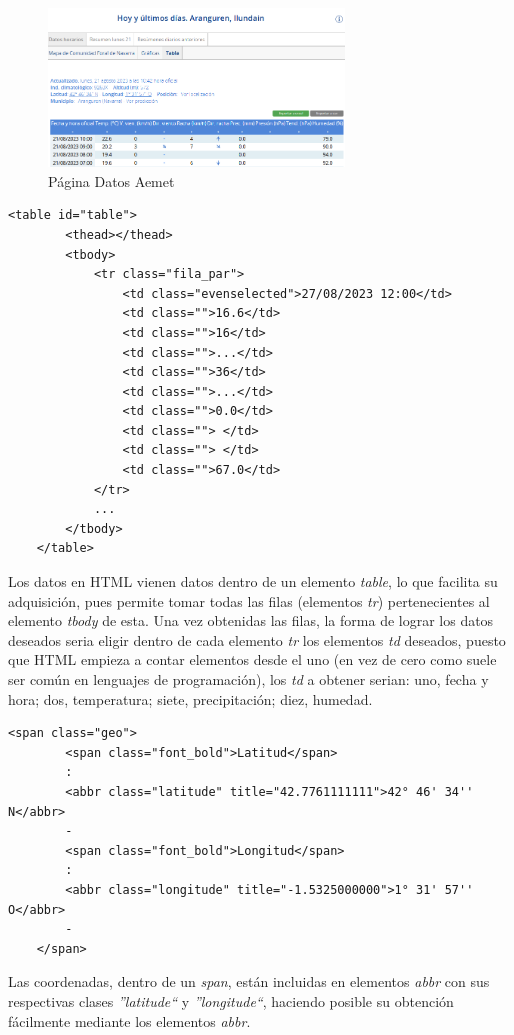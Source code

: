 \begin{figure} [H]
	\centering
	\includegraphics[width=0.7\textwidth]{fig/AemetData.png}
	\caption[Página Aemet de la estación en Aranguren (Navarra)]{Página Datos Aemet}
	\label{fig:ej3}
\end{figure}

\begin{lstlisting}[basicstyle=\footnotesize, caption={HTML tabla datos en Aemet}]
	<table id="table">
		<thead></thead>
		<tbody>
			<tr class="fila_par">
				<td class="evenselected">27/08/2023 12:00</td>
				<td class="">16.6</td>
				<td class="">16</td>
				<td class="">...</td>
				<td class="">36</td>
				<td class="">...</td>
				<td class="">0.0</td>
				<td class=""> </td>
				<td class=""> </td>
				<td class="">67.0</td>
			</tr>
			...
		</tbody>
	</table>
\end{lstlisting}

Los datos en HTML vienen datos dentro de un elemento \textit{table}, lo que facilita su adquisición, pues permite tomar todas las filas (elementos \textit{tr}) pertenecientes al elemento \textit{tbody} de esta. Una vez obtenidas las filas, la forma de lograr los datos deseados seria eligir dentro de cada elemento \textit{tr} los elementos \textit{td} deseados, puesto que HTML empieza a contar elementos desde el uno (en vez de cero como suele ser común en lenguajes de programación), los \textit{td} a obtener serian: uno, fecha y hora; dos, temperatura; siete, precipitación; diez, humedad.

\begin{lstlisting}[basicstyle=\footnotesize, caption={HTML coordenadas en Aemet}]
	<span class="geo">
		<span class="font_bold">Latitud</span>
		:
		<abbr class="latitude" title="42.7761111111">42° 46' 34'' N</abbr>
		-
		<span class="font_bold">Longitud</span>
		:
		<abbr class="longitude" title="-1.5325000000">1° 31' 57'' O</abbr>
		-
	</span>
\end{lstlisting}

Las coordenadas, dentro de un \textit{span}, están incluidas en elementos \textit{abbr} con sus respectivas clases \textit{''latitude``} y \textit{''longitude``}, haciendo posible su obtención fácilmente mediante los elementos \textit{abbr}.

